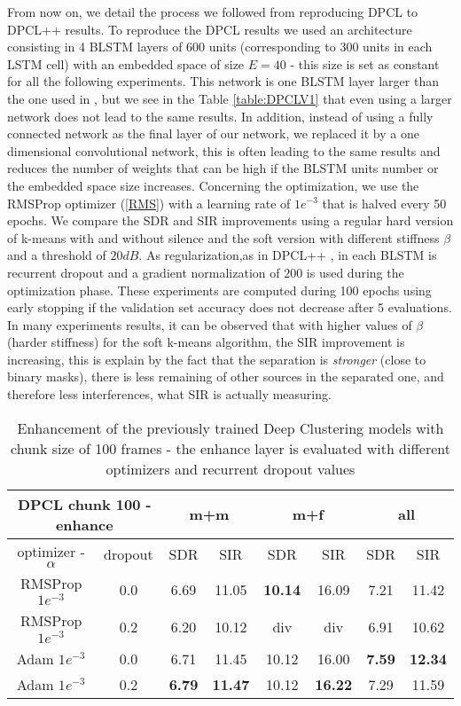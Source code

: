 \documentclass[master,final,11pt]{iscs-thesis}
\begin{document}
From now on, we detail the process we followed from reproducing DPCL \cite{DPCLV1} to DPCL++ \cite{DPCLV2} results.
To reproduce the DPCL results we used an architecture consisting in 4 BLSTM layers of 600 units (corresponding to 300 units in each LSTM cell) with an embedded space of size $E=40$ - this size is set as constant for all the following experiments. This network is one BLSTM layer larger than the one used in \cite{DPCLV1}, but we see in the Table \ref{table:DPCLV1} that even using a larger network does not lead to the same results. In addition, instead of using a fully connected network as the final layer of our network, we replaced it by a one dimensional convolutional network, this is often leading to the same results and reduces the number of weights that can be high if the BLSTM units number or the embedded space size increases. Concerning the optimization, we use the RMSProp optimizer (\ref{RMS}) with a learning rate of $1e^{-3}$ that is halved every 50 epochs. We compare the SDR and SIR improvements using a regular hard version of k-means with and without silence and the soft version with different stiffness $\beta$ and a threshold of $20dB$. As regularization,as in DPCL++ \cite{DPCLV2}, in each BLSTM is  recurrent dropout and a gradient normalization of $200$ is used during the optimization phase.
These experiments are computed during 100 epochs using early stopping if the validation set accuracy does not decrease after 5 evaluations.
In many experiments results, it can be observed that with higher values of $\beta$ (harder stiffness) for the soft k-means algorithm, the SIR improvement is increasing, this is explain by the fact that the separation is \textit{stronger} (close to binary masks), there is less remaining of other sources in the separated one, and therefore less interferences, what SIR is actually measuring.

\begin{table}[h]
\centering
\begin{tabular}{c|c|c|c|c|c|c|c}
\multicolumn{2}{c|}{DPCL chunk 100 - enhance} & \multicolumn{2}{c|}{m+m} & \multicolumn{2}{c|}{m+f} & \multicolumn{2}{c}{all} \\ 
\hline 
optimizer - $\alpha$ & dropout & SDR & SIR & SDR & SIR & SDR & SIR \\ 
\hline 
RMSProp $1e^{-3}$ & 0.0 & 6.69 & 11.05 & \textbf{10.14} & 16.09 & 7.21 & 11.42 \\ 
RMSProp $1e^{-3}$ & 0.2 & 6.20 & 10.12 & div & div & 6.91 & 10.62 \\ 
Adam $1e^{-3}$ & 0.0 & 6.71 & 11.45 & 10.12 & 16.00 & \textbf{7.59} & \textbf{12.34} \\ 
Adam $1e^{-3}$ & 0.2 &\textbf{6.79}& \textbf{11.47} & 10.12 & \textbf{16.22} & 7.29 & 11.59 \\ 
\end{tabular}
\captionsetup{justification=centering}
\caption{Enhancement of the previously trained Deep Clustering models with chunk size of 100 frames - the enhance layer is evaluated with different optimizers and recurrent dropout values}
\label{table:DPCL100enh}
\end{table}
\end{document}
